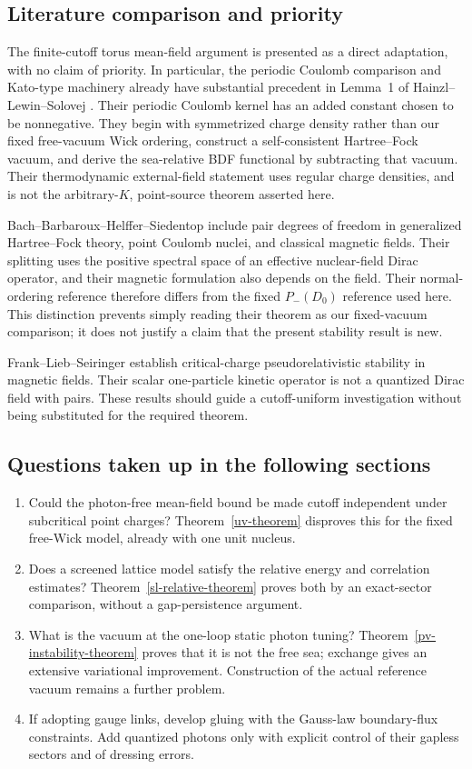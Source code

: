 \subsection{Literature comparison and priority}
The finite-cutoff torus mean-field argument is presented as a direct
adaptation, with no claim of priority. In particular, the periodic
Coulomb comparison and Kato-type machinery already have substantial
precedent in Lemma~1 of Hainzl--Lewin--Solovej \cite{HLSol2007}.
Their periodic Coulomb kernel has an added constant chosen to be
nonnegative. They begin with symmetrized charge density rather than our
fixed free-vacuum Wick ordering, construct a self-consistent
Hartree--Fock vacuum, and derive the sea-relative BDF functional by
subtracting that vacuum. Their thermodynamic external-field statement
uses regular charge densities, and is not the arbitrary-\(K\),
point-source theorem asserted here.

Bach--Barbaroux--Helffer--Siedentop \cite{BBHS1998} include pair degrees of
freedom in generalized Hartree--Fock theory, point Coulomb nuclei, and
classical magnetic fields. Their splitting uses the positive spectral
space of an effective nuclear-field Dirac operator, and their magnetic
formulation also depends on the field. Their normal-ordering reference
therefore differs from the fixed \(P_-(D_0)\) reference used here.
This distinction prevents simply reading their theorem as our
fixed-vacuum comparison; it does not justify a claim that the present
stability result is new.

Frank--Lieb--Seiringer \cite{FLS2007} establish critical-charge
pseudorelativistic stability in magnetic fields. Their scalar
one-particle kinetic operator is not a quantized Dirac field with pairs.
These results should guide a cutoff-uniform investigation without being
substituted for the required theorem.

\subsection{Questions taken up in the following sections}
\begin{enumerate}
\item Could the photon-free mean-field bound be made cutoff independent
under subcritical point charges? Theorem~\ref{uv-theorem} disproves this
for the fixed free-Wick model, already with one unit nucleus.
\item Does a screened lattice model satisfy the relative energy and
correlation estimates? Theorem~\ref{sl-relative-theorem} proves both by
an exact-sector comparison, without a gap-persistence argument.
\item What is the vacuum at the one-loop static photon tuning?
Theorem~\ref{pv-instability-theorem} proves that it is not the free sea;
exchange gives an extensive variational improvement. Construction of
the actual reference vacuum remains a further problem.
\item If adopting gauge links, develop gluing with the Gauss-law
boundary-flux constraints. Add quantized photons only with explicit
control of their gapless sectors and of dressing errors.
\end{enumerate}
